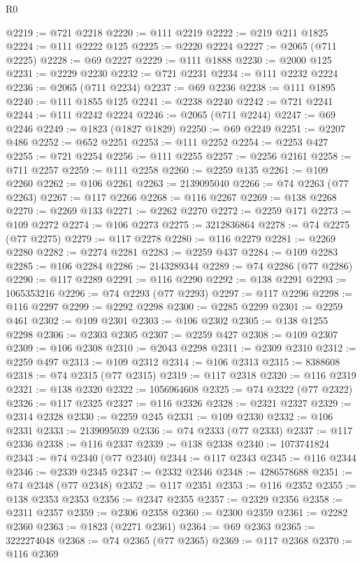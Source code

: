 \begin{lexlean}{R0}
\begin{coremodule}
@2219 := @721 @2218
@2220 := @111 @2219
@2222 := @219 @211 @1825
@2224 := @111 @2222 @125
@2225 := @2220 @2224
@2227 := @2065 (@711 @2225)
@2228 := @69 @2227
@2229 := @111 @1888
@2230 := @2000 @125
@2231 := @2229 @2230
@2232 := @721 @2231
@2234 := @111 @2232 @2224
@2236 := @2065 (@711 @2234)
@2237 := @69 @2236
@2238 := @111 @1895
@2240 := @111 @1855 @125
@2241 := @2238 @2240
@2242 := @721 @2241
@2244 := @111 @2242 @2224
@2246 := @2065 (@711 @2244)
@2247 := @69 @2246
@2249 := @1823 (@1827 @1829)
@2250 := @69 @2249
@2251 := @2207 @486
@2252 := @652 @2251
@2253 := @111 @2252
@2254 := @2253 @427
@2255 := @721 @2254
@2256 := @111 @2255
@2257 := @2256 @2161
@2258 := @711 @2257
@2259 := @111 @2258
@2260 := @2259 @135
@2261 := @109 @2260
@2262 := @106 @2261
@2263 := 2139095040
@2266 := @74 @2263 (@77 @2263)
@2267 := @117 @2266
@2268 := @116 @2267
@2269 := @138 @2268
@2270 := @2269 @133
@2271 := @2262 @2270
@2272 := @2259 @171
@2273 := @109 @2272
@2274 := @106 @2273
@2275 := 3212836864
@2278 := @74 @2275 (@77 @2275)
@2279 := @117 @2278
@2280 := @116 @2279
@2281 := @2269 @2280
@2282 := @2274 @2281
@2283 := @2259 @437
@2284 := @109 @2283
@2285 := @106 @2284
@2286 := 2143289344
@2289 := @74 @2286 (@77 @2286)
@2290 := @117 @2289
@2291 := @116 @2290
@2292 := @138 @2291
@2293 := 1065353216
@2296 := @74 @2293 (@77 @2293)
@2297 := @117 @2296
@2298 := @116 @2297
@2299 := @2292 @2298
@2300 := @2285 @2299
@2301 := @2259 @461
@2302 := @109 @2301
@2303 := @106 @2302
@2305 := @138 @1255 @2298
@2306 := @2303 @2305
@2307 := @2259 @427
@2308 := @109 @2307
@2309 := @106 @2308
@2310 := @2043 @2298
@2311 := @2309 @2310
@2312 := @2259 @497
@2313 := @109 @2312
@2314 := @106 @2313
@2315 := 8388608
@2318 := @74 @2315 (@77 @2315)
@2319 := @117 @2318
@2320 := @116 @2319
@2321 := @138 @2320
@2322 := 1056964608
@2325 := @74 @2322 (@77 @2322)
@2326 := @117 @2325
@2327 := @116 @2326
@2328 := @2321 @2327
@2329 := @2314 @2328
@2330 := @2259 @245
@2331 := @109 @2330
@2332 := @106 @2331
@2333 := 2139095039
@2336 := @74 @2333 (@77 @2333)
@2337 := @117 @2336
@2338 := @116 @2337
@2339 := @138 @2338
@2340 := 1073741824
@2343 := @74 @2340 (@77 @2340)
@2344 := @117 @2343
@2345 := @116 @2344
@2346 := @2339 @2345
@2347 := @2332 @2346
@2348 := 4286578688
@2351 := @74 @2348 (@77 @2348)
@2352 := @117 @2351
@2353 := @116 @2352
@2355 := @138 @2353 @2353
@2356 := @2347 @2355
@2357 := @2329 @2356
@2358 := @2311 @2357
@2359 := @2306 @2358
@2360 := @2300 @2359
@2361 := @2282 @2360
@2363 := @1823 (@2271 @2361)
@2364 := @69 @2363
@2365 := 3222274048
@2368 := @74 @2365 (@77 @2365)
@2369 := @117 @2368
@2370 := @116 @2369

\end{coremodule}
\end{lexlean}
